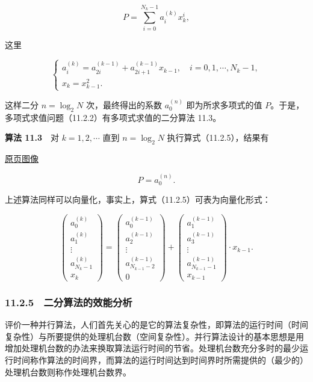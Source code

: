 \documentclass[
  10pt,
  fontset=fandol]{ctexart}
\begin{document}
\[
P=\sum_{i=0}^{N_k-1}a_i^{(k)}x_k^i,
\]

这里

\[
\begin{cases}
a_i^{(k)}=a_{2i}^{(k-1)}+a_{2i+1}^{(k-1)}x_{k-1},\quad i=0,1,\cdots,N_k-1,\\
x_k=x_{k-1}^2.
\end{cases}
\tag{11.2.5}
\]

这样二分 \(n=\log_2 N\) 次，最终得出的系数 \(a_0^{(n)}\) 即为所求多项式的值 \(P\)。于是，多项式求值问题（11.2.2）有多项式求值的二分算法 11.3。

\textbf{算法 11.3}　对 \(k=1,2,\cdots\) 直到 \(n=\log_2 N\) 执行算式（11.2.5），结果有

\href{../../source-images/pdf-283.jpeg}{原页图像}

\[
P=a_0^{(n)}.
\]

上述算法同样可以向量化，事实上，算式（11.2.5）可表为向量化形式：

\[
\begin{pmatrix}
a_0^{(k)}\\
a_1^{(k)}\\
\vdots\\
a_{N_k-1}^{(k)}\\
x_k
\end{pmatrix}
=
\begin{pmatrix}
a_0^{(k-1)}\\
a_2^{(k-1)}\\
\vdots\\
a_{N_{k-1}-2}^{(k-1)}\\
0
\end{pmatrix}
+
\begin{pmatrix}
a_1^{(k-1)}\\
a_3^{(k-1)}\\
\vdots\\
a_{N_{k-1}-1}^{(k-1)}\\
x_{k-1}
\end{pmatrix}\cdot x_{k-1}.
\]

\subsubsection{11.2.5　二分算法的效能分析}\label{ux4e8cux5206ux7b97ux6cd5ux7684ux6548ux80fdux5206ux6790}

评价一种并行算法，人们首先关心的是它的算法复杂性，即算法的运行时间（时间复杂性）与所要提供的处理机台数（空间复杂性）。并行算法设计的基本思想是用增加处理机台数的办法来换取算法运行时间的节省。处理机台数充分多时的最少运行时间称作算法的时间界，而算法的运行时间达到时间界时所需提供的（最少的）处理机台数则称作处理机台数界。
\end{document}
